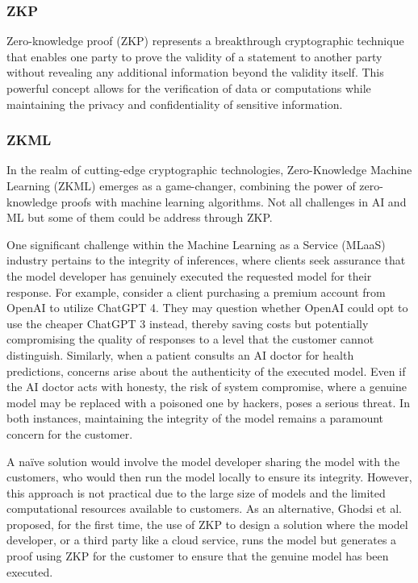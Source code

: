 \documentclass[conference]{IEEEtran}
\begin{document}
\subsubsection{ZKP}
Zero-knowledge proof (ZKP) represents a breakthrough cryptographic technique that enables one party to prove the validity of a statement to another party without revealing any additional information beyond the validity itself. This powerful concept allows for the verification of data or computations while maintaining the privacy and confidentiality of sensitive information.
\subsubsection{ZKML}

In the realm of cutting-edge cryptographic technologies, Zero-Knowledge Machine Learning (ZKML) emerges as a game-changer, combining the power of zero-knowledge proofs with machine learning algorithms. Not all challenges in AI and ML but some of them could be address through ZKP.

One significant challenge within the Machine Learning as a Service (MLaaS) industry pertains to the integrity of inferences, where clients seek assurance that the model developer has genuinely executed the requested model for their response. For example, consider a client purchasing a premium account from OpenAI to utilize ChatGPT 4. They may question whether OpenAI could opt to use the cheaper ChatGPT 3 instead, thereby saving costs but potentially compromising the quality of responses to a level that the customer cannot distinguish. Similarly, when a patient consults an AI doctor for health predictions, concerns arise about the authenticity of the executed model. Even if the AI doctor acts with honesty, the risk of system compromise, where a genuine model may be replaced with a poisoned one by hackers, poses a serious threat. In both instances, maintaining the integrity of the model remains a paramount concern for the customer.

A naïve solution would involve the model developer sharing the model with the customers, who would then run the model locally to ensure its integrity. However, this approach is not practical due to the large size of models and the limited computational resources available to customers. As an alternative, Ghodsi et al.  proposed, for the first time, the use of ZKP to design a solution where the model developer, or a third party like a cloud service, runs the model but generates a proof using ZKP for the customer to ensure that the genuine model has been executed.
\end{document}
